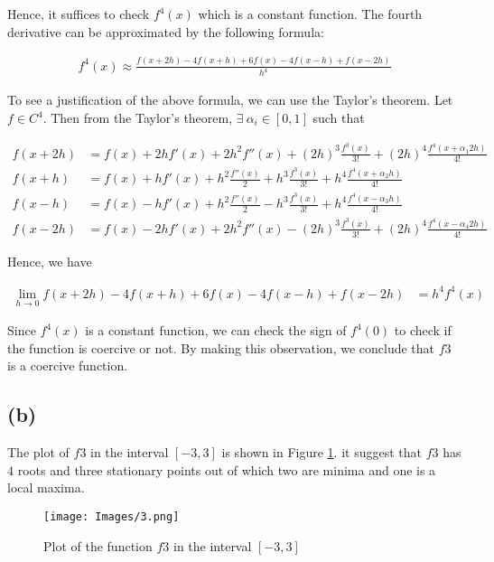 \documentclass{article}
\begin{document}
Hence, it suffices to check $f^4(x)$ which is a constant function. The fourth derivative can be approximated by the following formula:

\begin{align*}
    f^4(x) \approx \frac{f(x + 2h) - 4f(x + h) + 6f(x) - 4f(x - h) + f(x - 2h)}{h^4}
\end{align*}

To see a justification of the above formula, we can use the Taylor's theorem. Let $f \in C^4$. Then from the Taylor's theorem, $\exists\ \alpha_i \in [0, 1]$ such that

\begin{align*}
    f(x + 2h) &= f(x) + 2hf'(x) + 2h^2f''(x) + (2h)^3 \frac{f^3(x)}{3!} + (2h)^4 \frac{f^4(x + \alpha_1 2h)}{4!} \\
    f(x + h) &= f(x) + hf'(x) + h^2\frac{f''(x)}{2} + h^3 \frac{f^3(x)}{3!} + h^4 \frac{f^4(x + \alpha_2 h)}{4!} \\
    f(x - h) &= f(x) - hf'(x) + h^2\frac{f''(x)}{2} - h^3 \frac{f^3(x)}{3!} + h^4 \frac{f^4(x - \alpha_3 h)}{4!} \\
    f(x - 2h) &= f(x) - 2hf'(x) + 2h^2f''(x) - (2h)^3 \frac{f^3(x)}{3!} + (2h)^4 \frac{f^4(x - \alpha_4 2h)}{4!}
\end{align*}

Hence, we have

\begin{align*}
    \lim_{h \to 0} f(x + 2h) - 4f(x + h) + 6f(x) - 4f(x - h) + f(x - 2h) &= h^4 f^4(x)
\end{align*}

Since $f^4(x)$ is a constant function, we can check the sign of $f^4(0)$ to check if the function is coercive or not. By making this observation, we conclude that $f3$ is a coercive function.

\subsection*{(b)}

The plot of $f3$ in the interval $[-3, 3]$ is shown in Figure \ref{fig:f3_interval}. it suggest that $f3$ has $4$ roots and three stationary points out of which two are minima and one is a local maxima.

\begin{figure}
    \centering
    \texttt{[image: Images/3.png]}
    \caption{Plot of the function $f3$ in the interval $[-3, 3]$}
    \label{fig:f3_interval}
\end{figure}
\end{document}
